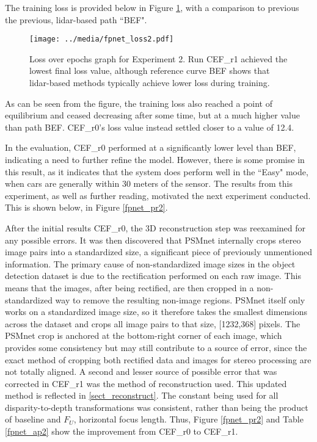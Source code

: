 The training loss is provided below in Figure \ref{fpnet_loss2}, with a comparison to previous the previous, lidar-based path ``BEF". 

\begin{figure}[ht]
	\centering
	\texttt{[image: ../media/fpnet\_loss2.pdf]}
	\caption{Loss over epochs graph for Experiment 2. Run CEF\_r1 achieved the lowest final loss value, although reference curve BEF shows that lidar-based methods typically achieve lower loss during training.}
	\label{fpnet_loss2}
\end{figure}

As can be seen from the figure, the training loss also reached a point of equilibrium and ceased decreasing after some time, but at a much higher value than path BEF. CEF\_r0's loss value instead settled closer to a value of 12.4. 

In the evaluation, CEF\_r0 performed at a significantly lower level than BEF, indicating a need to further refine the model. However, there is some promise in this result, as it indicates that the system does perform well in the ``Easy" mode, when cars are generally within 30 meters of the sensor. The results from this experiment, as well as further reading, motivated the next experiment conducted. This is shown below, in Figure \ref{fpnet_pr2}.

After the initial results CEF\_r0, the 3D reconstruction step was reexamined for any possible errors. It was then discovered that PSMnet internally crops stereo image pairs into a standardized size, a significant piece of previously unmentioned information. The primary cause of non-standardized image sizes in the object detection dataset is due to the rectification performed on each raw image. This means that the images, after being rectified, are then cropped in a non-standardized way to remove the resulting non-image regions. PSMnet itself only works on a standardized image size, so it therefore takes the smallest dimensions across the dataset and crops all image pairs to that size, [1232,368] pixels. The PSMnet crop is anchored at the bottom-right corner of each image, which provides some consistency but may still contribute to a source of error, since the exact method of cropping both rectified data and images for stereo processing are not totally aligned. A second and lesser source of possible error that was corrected in CEF\_r1 was the method of reconstruction used. This updated method is reflected in \ref{sect_reconstruct}. The constant being used for all disparity-to-depth transformations was consistent, rather than being the product of baseline and $F_U$, horizontal focus length. Thus, Figure \ref{fpnet_pr2} and Table \ref{fpnet_ap2} show the improvement from CEF\_r0 to CEF\_r1. 

